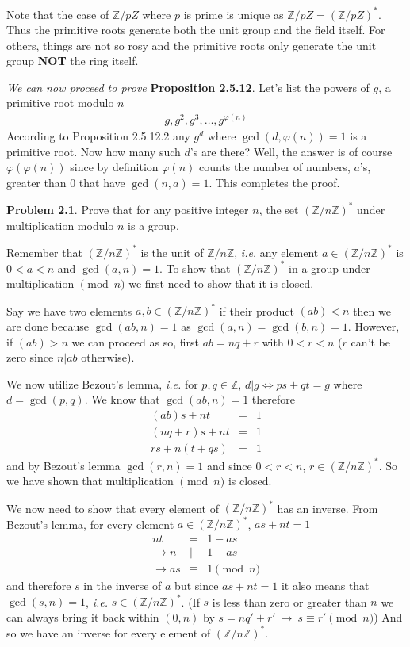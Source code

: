 \documentclass[aps,preprint,preprintnumbers,nofootinbib,showpacs,prd]{revtex4-1}
\newcommand{\ie}{{\it i.e.} }
\newcommand{\nbea}{\begin{eqnarray*}}
\newcommand{\neea}{\end{eqnarray*}}
\begin{document}
Note that the case of $\mathbb{Z}/p{Z}$ where $p$ is prime is unique as $\mathbb{Z}/p{Z} = (\mathbb{Z}/p{Z})^*$. Thus the primitive roots generate both the unit group and the field itself. For others, things are not so rosy and the primitive roots only generate the unit group {\bf NOT} the ring itself.

\bigskip

{\it We can now proceed to prove}  {\bf Proposition 2.5.12}. Let's list the powers of $g$, a primitive root modulo $n$
%
\nbea
g, g^2, g^3 , \dots, g^{\varphi(n)}
\neea
%
According to Proposition 2.5.12.2 any $g^d$ where $\gcd(d,\varphi(n))=1$ is a primitive root. Now how many such $d$'s are there? Well, the answer is of course $\varphi(\varphi(n))$ since by definition $\varphi(n)$ counts the number of numbers, $a$'s, greater than 0 that have $\gcd(n,a)=1$. This completes the proof.

{\bf Problem 2.1}. Prove that for any positive integer $n$, the set $(\mathbb{Z}/n\mathbb{Z})^*$ under multiplication modulo $n$ is a group.

Remember that $(\mathbb{Z}/n\mathbb{Z})^*$ is the unit of $\mathbb{Z}/n\mathbb{Z}$, \ie any element $a \in (\mathbb{Z}/n\mathbb{Z})^*$ is $0 < a < n$ and $\gcd(a,n) = 1$. To show that $(\mathbb{Z}/n\mathbb{Z})^*$ in a group under multiplication $\pmod{n}$ we first need to show that it is closed.

Say we have two elements $a,b \in (\mathbb{Z}/n\mathbb{Z})^*$ if their product $(ab) < n$ then we are done because $\gcd(ab,n)=1$ as $\gcd(a,n)=\gcd(b,n)=1$. However, if $(ab) > n$ we can proceed as so, first $ab = nq + r$ with $0 < r <n$ ($r$ can't be zero since $n|ab$ otherwise).

We now utilize Bezout's lemma, \ie for $p,q \in \mathbb{Z}$,  $d|g \Longleftrightarrow ps + qt = g$  where $d = \gcd(p,q)$. We know that $\gcd(ab,n)=1$ therefore
%
\nbea
(ab)s + nt & = & 1 \\
(nq + r)s + nt & = & 1 \\
rs + n(t+qs) & = & 1
\neea
%
and by Bezout's lemma $\gcd(r,n)=1$ and since $0 < r < n$, $r \in (\mathbb{Z}/n\mathbb{Z})^*$. So we have shown that multiplication $\pmod{n}$ is closed.

We now need to show that every element of $(\mathbb{Z}/n\mathbb{Z})^*$ has an inverse. From Bezout's lemma, for every element $a \in (\mathbb{Z}/n\mathbb{Z})^*$, $as + nt = 1$ 
%
\nbea
nt & = & 1 - as \\
\to n &|& 1 - as \\
\to as & \equiv & 1 \pmod{n}
\neea
%
and therefore $s$ in the inverse of $a$ but since $as + nt = 1$ it also means that $\gcd(s,n)=1$, \ie $s \in (\mathbb{Z}/n\mathbb{Z})^*$. (If $s$ is less than zero or greater than $n$ we can always bring it back within $(0,n)$ by $s = nq' + r' ~\to ~s \equiv r' \pmod{n}$) And so we have an inverse for every element of $(\mathbb{Z}/n\mathbb{Z})^*$.
\end{document}
